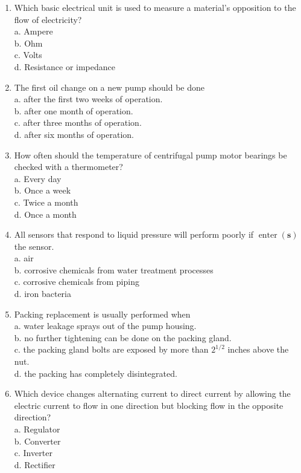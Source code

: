\documentclass[10pt]{article}
\begin{document}
\begin{enumerate}
  \item Which basic electrical unit is used to measure a material's opposition to the flow of electricity?\\
a. Ampere\\
b. Ohm\\
c. Volts\\
d. Resistance or impedance

  \item The first oil change on a new pump should be done\\
a. after the first two weeks of operation.\\
b. after one month of operation.\\
c. after three months of operation.\\
d. after six months of operation.

  \item How often should the temperature of centrifugal pump motor bearings be checked with a thermometer?\\
a. Every day\\
b. Once a week\\
c. Twice a month\\
d. Once a month

  \item All sensors that respond to liquid pressure will perform poorly if $\operatorname{enter}(\mathbf{s})$ the sensor.\\
a. air\\
b. corrosive chemicals from water treatment processes\\
c. corrosive chemicals from piping\\
d. iron bacteria

  \item Packing replacement is usually performed when\\
a. water leakage sprays out of the pump housing.\\
b. no further tightening can be done on the packing gland.\\
c. the packing gland bolts are exposed by more than $2^{1 / 2}$ inches above the nut.\\
d. the packing has completely disintegrated. 

\item Which device changes alternating current to direct current by allowing the electric current to flow in one direction but blocking flow in the opposite direction?\\
a. Regulator\\
b. Converter\\
c. Inverter\\
d. Rectifier


\end{enumerate}
\end{document}
